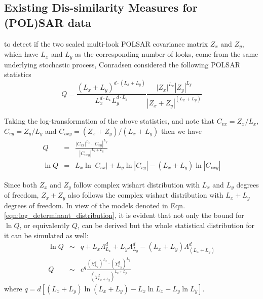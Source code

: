 \subsection{Existing Dis-similarity Measures for (POL)SAR data}

to detect if the two scaled multi-look POLSAR covariance matrix $Z_x$ and $Z_y$,
  which have $L_x$ and $L_y$ as the corresponding number of looks,
  come from the same underlying stochastic process,
Conradsen considered \cite{Conradsen_2003_TGRS_4} the following POLSAR statistics
\begin{equation}
  Q = \frac{(L_x+L_y)^{d \cdot (L_x+L_y)}}{L_x^{d \cdot L_x} L_y^{d \cdot L_y}} \frac{|Z_x|^{L_x} |Z_y|^{L_y} }{|Z_x+Z_y|^{(L_x+L_y)}}
\end{equation}

Taking the log-transformation of the above statistics, and note that $C_{vx} = Z_x / L_x$, $C_{vy} = Z_y / L_y$ and $C_{vxy} = (Z_x + Z_y)/(L_x + L_y)$ then we have
\begin{eqnarray}
  Q &=& \frac{|C_{vx}|^{L_x} \cdot |C_{vy}|^{L_y} }{|C_{vxy}|^{L_x + L_y}} \nonumber \\
  \ln Q &=& L_x \ln |C_{vx}| + L_y \ln |C_{vy}| - (L_x + L_y) \ln |C_{vxy}| \nonumber
\end{eqnarray}

Since both $Z_x$ and $Z_y$ follow complex wishart distribution with $L_x$ and $L_y$ degrees of freedom,
  $Z_x+Z_y$ also follows the complex wishart distribution with $L_x + L_y$ degrees of freedom.
In view of the models denoted in Eqn. \ref{eqn:log_determinant_distribution},
  it is evident that not only the bound for $\ln Q$, or equivalently $Q$, can be derived
  but the whole statistical distribution for it can be simulated as well:
\begin{eqnarray}
  \ln{Q} &\sim&  q + L_x \Lambda^d_{L_x} + L_y \Lambda^d_{L_y} - (L_x + L_y) \Lambda^d_{(L_x + L_y)} \\
  Q &\sim& e^q \frac{(\chi^d_{L_x})^{L_x} \cdot (\chi^d_{L_y})^{L_y}}{(\chi^d_{L_x + L_y})^{L_x + L_y}}  
\end{eqnarray}
where $q = d \left[ (L_x + L_y) \ln(L_x + L_y) - L_x \ln{L_x} - L_y \ln{L_y} \right]$.

